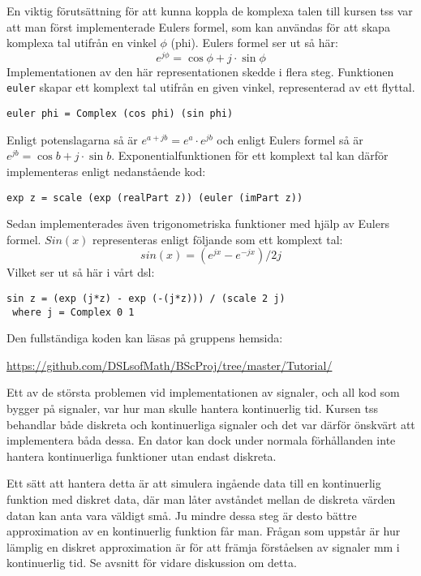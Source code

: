 \documentclass[12pt,a4paper,twoside,openright]{article}
\begin{document}
En viktig förutsättning för att kunna koppla de komplexa talen till
kursen \gls{tss} var att man först implementerade Eulers formel, som
kan användas för att skapa komplexa tal utifrån en vinkel \(\phi\)
(phi). Eulers formel ser ut så här:
\[e^{j\phi}=\cos \phi+ j \cdot \sin \phi \]
Implementationen av den här representationen skedde i flera steg.
Funktionen \texttt{euler} skapar ett komplext tal utifrån
en given vinkel, representerad av ett flyttal.
\begin{verbatim}
euler phi = Complex (cos phi) (sin phi)
\end{verbatim}
Enligt potenslagarna så är \(e^{a+jb} = e^{a} \cdot e^{jb}\) och
enligt Eulers formel så är \(e^{j b} = \cos b + j\cdot \sin b\).
Exponentialfunktionen för ett komplext tal kan därför implementeras
enligt nedanstående kod:
\begin{verbatim}
exp z = scale (exp (realPart z)) (euler (imPart z))
\end{verbatim}
Sedan implementerades även trigonometriska funktioner med hjälp av
Eulers formel. $Sin(x)$ representeras enligt följande som ett komplext
tal:
\[ sin(x) = (e^{j x} - e^{-j x}) / 2 j \]
Vilket ser ut så här i vårt \gls{dsl}:
\begin{verbatim}
sin z = (exp (j*z) - exp (-(j*z))) / (scale 2 j)
 where j = Complex 0 1
\end{verbatim}

Den fullständiga koden kan läsas på gruppens hemsida:

\url{https://github.com/DSLsofMath/BScProj/tree/master/Tutorial/}

Ett av de största problemen vid implementationen av signaler, och all
kod som bygger på signaler, var hur man skulle hantera kontinuerlig
tid. Kursen \gls{tss} behandlar både diskreta och kontinuerliga
signaler och det var därför önskvärt att implementera båda dessa. En
dator kan dock under normala förhållanden inte hantera kontinuerliga
funktioner utan endast diskreta.

Ett sätt att hantera detta är att simulera ingående data till en
kontinuerlig funktion med diskret data, där man låter avståndet mellan
de diskreta värden datan kan anta vara väldigt små. Ju mindre dessa
steg är desto bättre approximation av en kontinuerlig funktion får
man. Frågan som uppstår är hur lämplig en diskret approximation är för
att främja förståelsen av signaler mm i kontinuerlig tid. Se avsnitt
 för vidare diskussion om detta.
\end{document}
